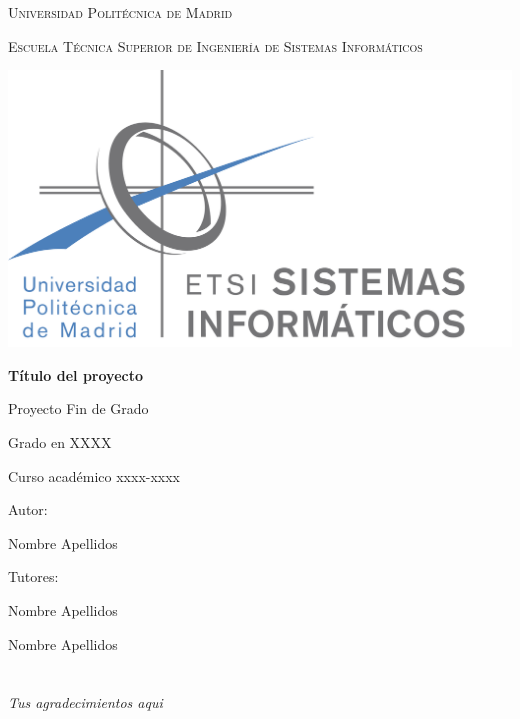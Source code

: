 \documentclass[a4paper]{report}
\begin{document}
\begin{titlepage}
\thispagestyle{empty}
\centering %
{\scshape\Large  Universidad Politécnica de Madrid \par}
{\scshape\Large Escuela Técnica Superior de Ingeniería de Sistemas Informáticos \par}
\vfill
{\includegraphics[width=1\textwidth]{logo_etsisi.png}\par}
\vfill
{\bfseries\LARGE Título del proyecto \par}
\vfill
{\Large Proyecto Fin de Grado \par}
\vfill
{\Large Grado en XXXX \par}
\vfill
{\Large Curso académico xxxx-xxxx \par}
\vfill
{\Large Autor: \par}
{\Large Nombre Apellidos \par}
\vfill
{\Large Tutores: \par}
{\Large Nombre Apellidos \par}
{\Large Nombre Apellidos \par}

\end{titlepage}


\chapter*{}
\thispagestyle{empty}
\begin{flushright}
\textit{Tus agradecimientos aqui}
\end{flushright}
\end{document}
